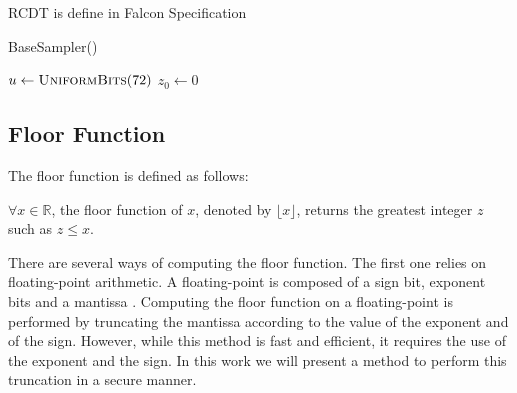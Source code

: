 \documentclass[runningheads]{llncs}
\begin{document}
RCDT is define in Falcon Specification
\begin{algorithm}
  \caption{BaseSampler() \cite{prest2020falcon}}
  \KwData{--}
  \small
$u \leftarrow \textsc{UniformBits}(72)$\;
  $z_0 \leftarrow 0$\;
\;
\end{algorithm}


\subsection{Floor Function}\label{subsec:floorfunction}
The floor function is defined as follows:
\begin{definition}\label{def:floorfunction}
  $\forall x \in \mathbb{R}$, the floor function of $x$, denoted by $\lfloor x \rfloor$, returns the greatest integer $z$ such as $z\leq x$.
\end{definition}
There are several ways of computing the floor function. The first one relies on floating-point arithmetic. A floating-point is composed of a sign bit, exponent bits and a mantissa \cite{kahan1996ieee}. Computing the floor function on a floating-point is performed by truncating the mantissa according to the value of the exponent and of the sign. However, while this method is fast and efficient, it requires the use of the exponent and the sign. In this work we will present a method to perform this truncation in a secure manner.

\medskip
\end{document}
